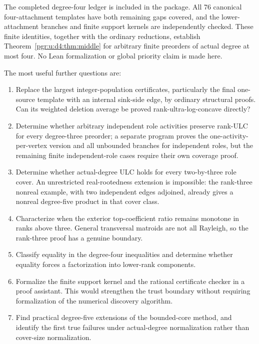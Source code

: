 \documentclass[11pt]{article}
\numberwithin{equation}{section}
\theoremstyle{definition}\newtheorem{definition}[theorem]{Definition}\newtheorem{remark}[theorem]{Remark}
\begin{document}
The completed degree-four ledger is included in the package. All 76 canonical four-attachment templates have both remaining gaps covered, and the lower-attachment branches and finite support kernels are independently checked. These finite identities, together with the ordinary reductions, establish Theorem~\ref{pgr:u:d4:thm:middle} for arbitrary finite preorders of actual degree at most four. No Lean formalization or global priority claim is made here.

The most useful further questions are:
\begin{enumerate}[leftmargin=*]
\item Replace the largest integer-population certificates, particularly the final one-source template with an internal sink-side edge, by ordinary structural proofs. Can its weighted deletion average be proved rank-ultra-log-concave directly?
\item Determine whether arbitrary independent role activities preserve rank-ULC for every degree-three preorder; a separate program proves the one-activity-per-vertex version and all unbounded branches for independent roles, but the remaining finite independent-role cases require their own coverage proof.
\item Determine whether actual-degree ULC holds for every two-by-three role cover. An unrestricted real-rootedness extension is impossible: the rank-three nonreal example, with two independent edges adjoined, already gives a nonreal degree-five product in that cover class.
\item Characterize when the exterior top-coefficient ratio remains monotone in ranks above three. General transversal matroids are not all Rayleigh, so the rank-three proof has a genuine boundary.
\item Classify equality in the degree-four inequalities and determine whether equality forces a factorization into lower-rank components.
\item Formalize the finite support kernel and the rational certificate checker in a proof assistant. This would strengthen the trust boundary without requiring formalization of the numerical discovery algorithm.
\item Find practical degree-five extensions of the bounded-core method, and identify the first true failures under actual-degree normalization rather than cover-size normalization.
\end{enumerate}
\end{document}
